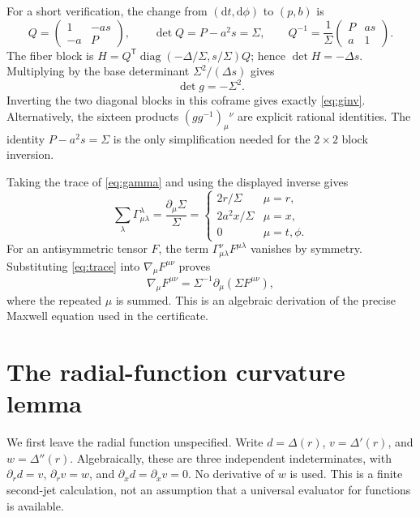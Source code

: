 \documentclass[11pt,a4paper]{article}
\numberwithin{equation}{section}
\theoremstyle{definition}\newtheorem{definition}[theorem]{Definition}
\theoremstyle{remark}\newtheorem{remark}[theorem]{Remark}
\newcommand{\dd}{\mathrm{d}}
\begin{document}
For a short verification, the change from $(\dd t,\dd\phi)$ to $(p,b)$ is
\begin{equation}\label{eq:Q}
 Q=\begin{pmatrix}1&-as\\-a&P\end{pmatrix},\qquad
 \det Q=P-a^2s=\Sigma,\qquad
 Q^{-1}=\frac1\Sigma\begin{pmatrix}P&as\\a&1\end{pmatrix}.
\end{equation}
The fiber block is $H=Q^{\mathsf T}\operatorname{diag}(-\Delta/\Sigma,s/\Sigma)Q$; hence $\det H=-\Delta s$. Multiplying by the base determinant $\Sigma^2/(\Delta s)$ gives
\begin{equation}\label{eq:det}
 \det g=-\Sigma^2.
\end{equation}
Inverting the two diagonal blocks in this coframe gives exactly \eqref{eq:ginv}. Alternatively, the sixteen products $(gg^{-1})_{\mu}{}^\nu$ are explicit rational identities. The identity $P-a^2s=\Sigma$ is the only simplification needed for the $2\times2$ block inversion.

Taking the trace of \eqref{eq:gamma} and using the displayed inverse gives
\begin{equation}\label{eq:trace}
 \sum_\lambda\Gamma^\lambda_{\mu\lambda}
 =\frac{\partial_\mu\Sigma}{\Sigma}
 =\begin{cases}2r/\Sigma&\mu=r,\\2a^2x/\Sigma&\mu=x,\\0&\mu=t,\phi.\end{cases}
\end{equation}
For an antisymmetric tensor $F$, the term $\Gamma^\nu_{\mu\lambda}F^{\mu\lambda}$ vanishes by symmetry. Substituting \eqref{eq:trace} into $\nabla_\mu F^{\mu\nu}$ proves
\[
 \nabla_\mu F^{\mu\nu}
 =\Sigma^{-1}\partial_\mu(\Sigma F^{\mu\nu}),
\]
where the repeated $\mu$ is summed. This is an algebraic derivation of the precise Maxwell equation used in the certificate.

\section{The radial-function curvature lemma}\label{sec:offshell}

We first leave the radial function unspecified. Write $d=\Delta(r)$, $v=\Delta'(r)$, and $w=\Delta''(r)$. Algebraically, these are three independent indeterminates, with $\partial_r d=v$, $\partial_r v=w$, and $\partial_x d=\partial_x v=0$. No derivative of $w$ is used. This is a finite second-jet calculation, not an assumption that a universal evaluator for functions is available.
\end{document}
